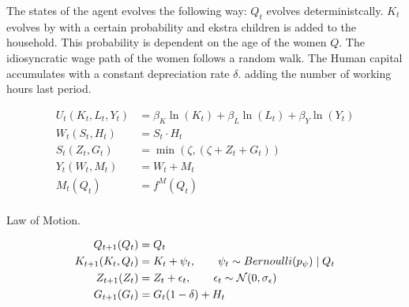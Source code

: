 The states of the agent evolves the following way: $Q_t$ evolves deterministcally. $K_t$ evolves by with a certain probability and ekstra children is added to the household. This probability is dependent on the age of the women $Q$. The idiosyncratic wage path of the women follows a random walk. The Human capital accumulates with a constant depreciation rate $\delta$. adding the number of working hours last period.

\begin{align}
    U_t(K_t, L_t, Y_t) &= \beta_K \ln(K_t) + \beta_L \ln(L_t) + \beta_Y \ln(Y_t) \\
    W_t(S_t, H_t) &=S_t \cdot H_t \\
    S_t(Z_t, G_t) &= \min(\zeta, (\zeta + Z_t + G_t))  \\
    Y_t(W_t, M_t) &= W_t + M_t\\
    M_t(Q_t) &= f^M(Q_t) \\
\end{align}


Law of Motion.

\begin{align}
    Q_{t+1}(Q_t) &= Q_t \\
    K_{t+1}(K_t, Q_t)  &= K_{t} + \psi_t, \qquad \psi_t \sim Bernoulli(p_\psi) \mid Q_t \\
    Z_{t+1}(Z_t) &= Z_t + \epsilon_t, \qquad \epsilon_t \sim \mathcal{N}(0, \sigma_\epsilon) \\
    G_{t+1}(G_t) &= G_t(1 - \delta) + H_t \\
\end{align}

